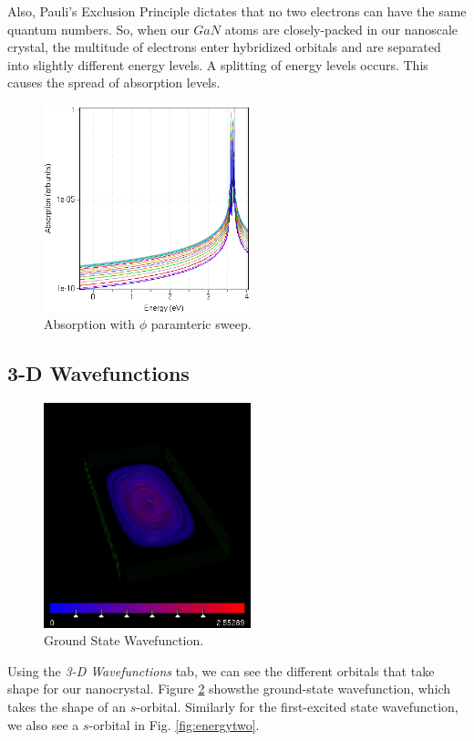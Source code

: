 \documentclass{IEEEtran}
\begin{document}
Also, Pauli's Exclusion Principle dictates that no two electrons can have the same quantum numbers. So, when our \(GaN\) atoms are closely-packed in our nanoscale crystal, the multitude of electrons enter hybridized orbitals and are separated into slightly different energy levels. A splitting of energy levels occurs. This causes the spread of absorption levels.

\begin{figure}[!h] 
    \centering
    \includegraphics*[width = 6cm]{AbsorptionSweepAnglephi.png}
    \caption{Absorption with \(\phi\) paramteric sweep.}
    \label{fig:absorption}
\end{figure}    

\subsection{3-D Wavefunctions}

\begin{figure}[!h] 
    \centering
    \includegraphics*[width = 6cm]{energyone.jpg}
    \caption{Ground State Wavefunction.}
    \label{fig:energyone}
\end{figure}

Using the \textit{3-D Wavefunctions} tab, we can see the different orbitals that take shape for our nanocrystal. Figure \ref{fig:energyone} showsthe ground-state wavefunction, which takes the shape of an \(s\)-orbital. Similarly for the first-excited state wavefunction, we also see a \(s\)-orbital in Fig. \ref{fig:energytwo}.
\end{document}
